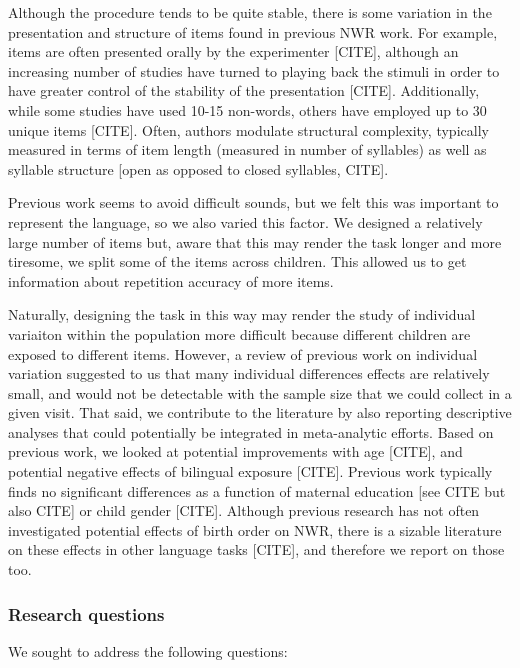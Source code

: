 \documentclass[english,,man,floatsintext]{apa6}
\begin{document}
Although the procedure tends to be quite stable, there is some variation in the presentation and structure of items found in previous NWR work. For example, items are often presented orally by the experimenter {[}CITE{]}, although an increasing number of studies have turned to playing back the stimuli in order to have greater control of the stability of the presentation {[}CITE{]}. Additionally, while some studies have used 10-15 non-words, others have employed up to 30 unique items {[}CITE{]}. Often, authors modulate structural complexity, typically measured in terms of item length (measured in number of syllables) as well as syllable structure {[}open as opposed to closed syllables, CITE{]}.

Previous work seems to avoid difficult sounds, but we felt this was important to represent the language, so we also varied this factor. We designed a relatively large number of items but, aware that this may render the task longer and more tiresome, we split some of the items across children. This allowed us to get information about repetition accuracy of more items.

Naturally, designing the task in this way may render the study of individual variaiton within the population more difficult because different children are exposed to different items. However, a review of previous work on individual variation suggested to us that many individual differences effects are relatively small, and would not be detectable with the sample size that we could collect in a given visit. That said, we contribute to the literature by also reporting descriptive analyses that could potentially be integrated in meta-analytic efforts. Based on previous work, we looked at potential improvements with age {[}CITE{]}, and potential negative effects of bilingual exposure {[}CITE{]}. Previous work typically finds no significant differences as a function of maternal education {[}see CITE but also CITE{]} or child gender {[}CITE{]}. Although previous research has not often investigated potential effects of birth order on NWR, there is a sizable literature on these effects in other language tasks {[}CITE{]}, and therefore we report on those too.

\hypertarget{research-questions}{%
\subsubsection{Research questions}\label{research-questions}}

We sought to address the following questions:
\end{document}
